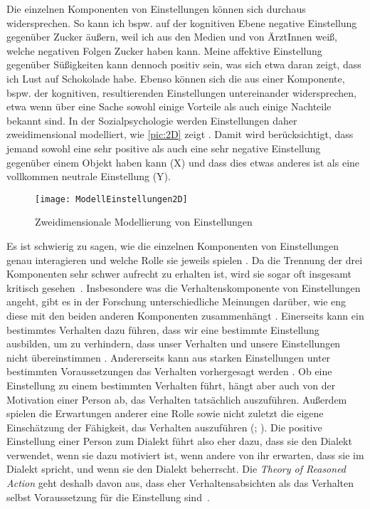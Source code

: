 Die einzelnen Komponenten von Einstellungen können sich durchaus widersprechen. 
So kann ich bspw. auf der kognitiven Ebene negative Einstellung gegenüber Zucker äußern, weil ich aus den Medien und von ÄrztInnen weiß, welche negativen Folgen Zucker haben kann. 
Meine affektive Einstellung gegenüber Süßigkeiten kann dennoch positiv sein, was sich etwa daran zeigt, dass ich Lust auf Schokolade habe.
Ebenso können sich die aus einer Komponente, bspw. der kognitiven, resultierenden Einstellungen untereinander widersprechen, etwa wenn über eine Sache sowohl einige Vorteile als auch einige Nachteile bekannt sind. 
In der Sozialpsychologie werden Einstellungen daher zweidimensional modelliert, wie \autoref{pic:2D} zeigt \citep[s.][207]{Jonas.2014}. 
Damit wird berücksichtigt, dass jemand sowohl eine sehr positive als auch eine sehr negative Einstellung gegenüber einem Objekt haben kann (X) und dass dies etwas anderes ist als eine vollkommen neutrale Einstellung (Y). 

\begin{figure}
\texttt{[image: ModellEinstellungen2D]} 
\caption{Zweidimensionale Modellierung von Einstellungen \citep[s.][207]{Jonas.2014}}
\label{pic:2D}
\end{figure}

Es ist schwierig zu sagen, wie die einzelnen Komponenten von Einstellungen genau interagieren und welche Rolle sie jeweils spielen \citep[s.][400]{Lasagabaster.2005}. 
Da die Trennung der drei Komponenten sehr schwer aufrecht zu erhalten ist, wird sie sogar oft insgesamt kritisch gesehen~\citep[s. etwa][34]{Cuonz.2014}. 
Insbesondere was die Verhaltenskomponente von Einstellungen angeht, gibt es in der Forschung unterschiedliche Meinungen dar{\"u}ber, wie eng diese mit den beiden anderen Komponenten zusammenh{\"a}ngt \citep[s.][25]{Garrett.2012}. 
Einerseits kann ein bestimmtes Verhalten dazu führen, dass wir eine bestimmte Einstellung ausbilden, um zu verhindern, dass unser Verhalten und unsere Einstellungen nicht übereinstimmen \citep[s.][203]{Jonas.2014}. 
Andererseits kann aus starken Einstellungen unter bestimmten Voraussetzungen das Verhalten vorhergesagt werden \citep[s.][224--225]{Jonas.2014}. 
Ob eine Einstellung zu einem bestimmten Verhalten führt, hängt aber auch von der Motivation einer Person ab, das Verhalten tatsächlich auszuführen. 
Außerdem spielen die Erwartungen anderer eine Rolle sowie nicht zuletzt die eigene Einschätzung der Fähigkeit, das Verhalten auszuführen (\citealp[s.][224--225]{Jonas.2014}; \citealp[s. auch][]{Ajzen.1977}). 
Die positive Einstellung einer Person zum Dialekt führt also eher dazu, dass sie den Dialekt verwendet, wenn sie dazu motiviert ist, wenn andere von ihr erwarten, dass sie im Dialekt spricht, und wenn sie den Dialekt beherrscht. 
Die \textit{Theory of Reasoned Action} geht deshalb davon aus, dass eher Verhaltensabsichten als das Verhalten selbst Voraussetzung für die Einstellung sind~\citep[s.][26--27]{Garrett.2012}. 

